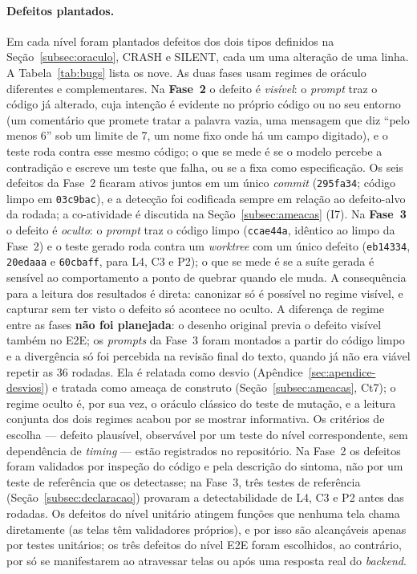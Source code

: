 \documentclass[12pt]{article}
\begin{document}
\paragraph{Defeitos plantados.} Em cada nível foram plantados defeitos dos
dois tipos definidos na Seção~\ref{subsec:oraculo}, CRASH e SILENT, cada um
uma alteração de uma linha. A Tabela~\ref{tab:bugs} lista os nove. As duas
fases usam regimes de oráculo diferentes e complementares. Na \textbf{Fase~2}
o defeito é \emph{visível}: o \textit{prompt} traz o código já alterado,
cuja intenção é evidente no próprio código ou no seu entorno (um comentário
que promete tratar a palavra vazia, uma mensagem que diz ``pelo menos 6''
sob um limite de 7, um nome fixo onde há um campo digitado), e o teste roda
contra esse mesmo código; o que se mede é se o modelo percebe a contradição
e escreve um teste que falha, ou se a fixa como especificação. Os seis
defeitos da Fase~2 ficaram ativos juntos em um único \textit{commit}
(\texttt{295fa34}; código limpo em \texttt{03c9bac}), e a detecção foi
codificada sempre em relação ao defeito-alvo da rodada; a co-atividade é
discutida na Seção~\ref{subsec:ameacas} (I7). Na \textbf{Fase~3} o defeito
é \emph{oculto}: o \textit{prompt} traz o código limpo (\texttt{ccae44a},
idêntico ao limpo da Fase~2) e o teste gerado roda contra um \textit{worktree}
com um único defeito (\texttt{eb14334}, \texttt{20edaaa} e
\texttt{60cbaff}, para L4, C3 e P2); o que se mede é se a suíte gerada é
sensível ao comportamento a ponto de quebrar quando ele muda. A consequência
para a leitura dos resultados é direta: canonizar só é possível no regime
visível, e capturar sem ter visto o defeito só acontece no oculto. A
diferença de regime entre as fases \textbf{não foi planejada}: o desenho
original previa o defeito visível também no E2E; os \textit{prompts} da
Fase~3 foram montados a partir do código limpo e a divergência só foi
percebida na revisão final do texto, quando já não era viável repetir as 36
rodadas. Ela é relatada como desvio (Apêndice~\ref{sec:apendice-desvios}) e
tratada como ameaça de construto (Seção~\ref{subsec:ameacas}, Ct7); o regime
oculto é, por sua vez, o oráculo clássico do teste de mutação, e a leitura
conjunta dos dois regimes acabou por se mostrar informativa. Os critérios de
escolha --- defeito plausível, observável por um teste do nível
correspondente, sem dependência de \textit{timing} --- estão registrados no
repositório. Na Fase~2 os defeitos foram validados por inspeção do código e
pela descrição do sintoma, não por um teste de referência que os detectasse;
na Fase~3, três testes de referência (Seção~\ref{subsec:declaracao})
provaram a detectabilidade de L4, C3 e P2 antes das rodadas. Os defeitos do nível
unitário atingem funções que nenhuma tela chama diretamente (as telas têm
validadores próprios), e por isso são alcançáveis apenas por testes
unitários; os três defeitos do nível E2E foram escolhidos, ao contrário, por
só se manifestarem ao atravessar telas ou após uma resposta real do
\textit{backend}.
\end{document}
